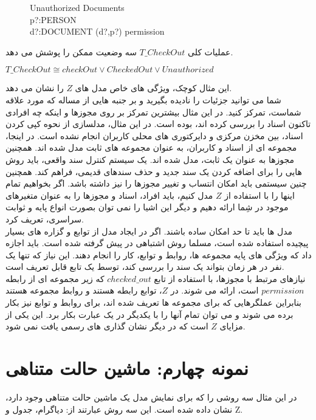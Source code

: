 \begin{figure}
\centering
\begin{schema}{Unauthorized}
\Xi Documents\\
p?:PERSON\\
d?:DOCUMENT
\ST
(d?,p?) \notin permission
\end{schema}
\caption{}
\label{unauthorized}
\end{figure}
عملیات کلی
$T\_CheckOut$
سه وضعیت ممکن را پوشش می دهد. 
\begin{LTR}
$T\_CheckOut \cong checkOut \vee CheckedOut \vee Unauthorized$
\end{LTR}
این مثال کوچک، ویژگی های خاص مدل های $Z$ را نشان می دهد.
\\
شما می توانید جزئیات را نادیده بگیرید و بر جنبه هایی از مساله که مورد علاقه شماست، تمرکز کنید. در این مثال بیشترین تمرکز بر روی مجوزها و اینکه چه افرادی تاکنون اسناد را بررسی کرده اند، بوده است. در این مثال، مدلسازی از نحوه کپی کردن اسناد، بین مخزن مرکزی و دایرکتوری های محلی کاربران انجام نشده است. در اینجا، مجموعه ای از اسناد و کاربران، به عنوان مجموعه های ثابت مدل شده اند. همچنین مجوزها به عنوان یک ثابت، مدل شده اند. یک سیستم کنترل سند واقعی، باید روش هایی را برای اضافه کردن یک سند جدید و حذف سندهای قدیمی، فراهم کند. همچنین چنین سیستمی باید امکان انتساب و تغییر مجوزها را نیز داشته باشد. اگر بخواهیم تمام اینها را با استفاده از $Z$ مدل کنیم، باید افراد، اسناد و مجوزها را به عنوان متغیرهای موجود در شِما ارائه دهیم و دیگر این اشیا را نمی توان بصورت انواع پایه و ثوابت سراسری، تعریف کرد.
\\
مدل ها باید تا حد امکان ساده باشند. اگر در ایجاد مدل از توابع و گزاره های بسیار پیچیده استفاده شده است، مسلما روش اشتباهی در پیش گرفته شده است. باید اجازه داد که ویژگی های پایه مجموعه ها، روابط و توابع، کار را انجام دهند. این نیاز که تنها یک نفر در هر زمان بتواند یک سند را بررسی کند، توسط یک تابع قابل تعریف است. 
\\
نیازهای مرتبط با مجوزها، با استفاده از تابع $checked\_out$ که زیر مجموعه ای از رابطه $permission$ است، ارائه می شوند. در $Z$، توابع رابطه هستند و روابط مجموعه هستند بنابراین عملگرهایی که برای مجموعه ها تعریف شده اند، برای روابط و توابع نیز بکار برده می شوند و می توان تمام آنها را با یکدیگر در یک عبارت بکار برد. این یکی از مزایای $Z$ است که در دیگر نشان گذاری های رسمی یافت نمی شود. 


\section{نمونه چهارم: ماشین حالت متناهی} 
در این مثال سه روشی را که برای نمایش مدل یک ماشین حالت متناهی وجود دارد، نشان داده شده است. این سه روش عبارتند از: دیاگرام، جدول و Z.
